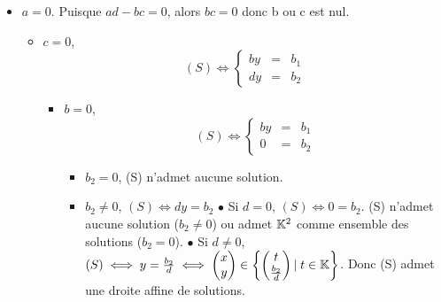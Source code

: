 \documentclass{article}
\renewenvironment{question_kholle}[2][ ]
{
	\subsection{\texorpdfstring{#2}{}}
	\notblank{#1}
	{
		\noindent #1
		\bigbreak
	}
	{}
	\begin{proof}
}
{
	\end{proof}
}
\begin{document}
\begin{question_kholle}
\begin{itemize}[label=$\bullet$ Supposons]
    \item $a = 0$. Puisque $ad - bc = 0$, alors $bc = 0$ donc b ou c est nul.

          \begin{itemize}[label=$\bullet$ Si]
            \item $c = 0$,
                  \begin{equation*}
                    (S) \iff
                    \left\{ \begin{array}{ccc}
                      by & = & b_1 \\
                      dy & = & b_2
                    \end{array} \right.
                  \end{equation*}

                  \begin{itemize}[label=$\bullet$ Si]
                    \item $b = 0$,
                          \begin{equation*}
                            (S) \iff
                            \left\{ \begin{array}{ccc}
                              by & = & b_1 \\
                              0  & = & b_2
                            \end{array} \right.
                          \end{equation*}
                          \begin{itemize}[label=$\bullet$ Si]
                            \item $b_2 = 0$, (S) n'admet aucune solution.
                            \item $b_2 \neq 0$, $(S) \iff dy = b_2$
                                  \subitem$\bullet$ Si $d = 0$, $(S) \iff 0 = b_2$. (S) n'admet aucune solution ($b_2 \neq 0$) ou admet $\mathbb K^2$ comme ensemble des solutions ($b_2 = 0$).
                                  \subitem$\bullet$ Si $d \neq 0$, $(S) \iff y = \frac{b_2}{d} \iff \begin{pmatrix} x \\ y \end{pmatrix} \in \begin{Bmatrix} \begin{pmatrix} t \\ \frac{b_2}{d} \end{pmatrix} |\; t \in \mathbb K \end{Bmatrix}$. Donc (S) admet une droite affine de solutions.

\end{itemize}
\end{itemize}
\end{itemize}
\end{itemize}
\end{question_kholle}
\end{document}
